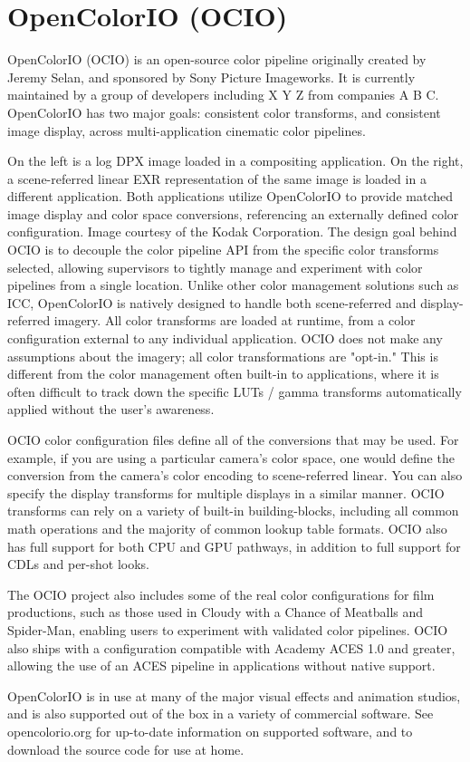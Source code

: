 \section{OpenColorIO (OCIO)}%
\label{sec:opencolorio-ocio}

OpenColorIO (OCIO) is an open-source color pipeline originally created by Jeremy Selan, and sponsored by Sony Picture Imageworks. It is currently maintained by a group of developers including X Y Z from companies A B C. OpenColorIO has two major goals: consistent color transforms, and consistent image display, across multi-application cinematic color pipelines.

On the left is a log DPX image loaded in a compositing application. On the right, a scene-referred linear EXR representation of the same image is loaded in a different application. Both applications utilize OpenColorIO to provide matched image display and color space conversions, referencing an externally defined color configuration. Image courtesy of the Kodak Corporation.
The design goal behind OCIO is to decouple the color pipeline API from the specific color transforms selected, allowing supervisors to tightly manage and experiment with color pipelines from a single location. Unlike other color management solutions such as ICC, OpenColorIO is natively designed to handle both scene-referred and display-referred imagery. All color transforms are loaded at runtime, from a color configuration external to any individual application. OCIO does not make any assumptions about the imagery; all color transformations are "opt-in." This is different from the color management often built-in to applications, where it is often difficult to track down the specific LUTs / gamma transforms automatically applied without the user's awareness.

OCIO color configuration files define all of the conversions that may be used. For example, if you are using a particular camera's color space, one would define the conversion from the camera's color encoding to scene-referred linear. You can also specify the display transforms for multiple displays in a similar manner. OCIO transforms can rely on a variety of built-in building-blocks, including all common math operations and the majority of common lookup table formats. OCIO also has full support for both CPU and GPU pathways, in addition to full support for CDLs and per-shot looks.

The OCIO project also includes some of the real color configurations for film productions, such as those used in Cloudy with a Chance of Meatballs and Spider-Man, enabling users to experiment with validated color pipelines. OCIO also ships with a configuration compatible with Academy ACES 1.0 and greater, allowing the use of an ACES pipeline in applications without native support.

OpenColorIO is in use at many of the major visual effects and animation studios, and is also supported out of the box in a variety of commercial software. See opencolorio.org for up-to-date information on supported software, and to download the source code for use at home.

